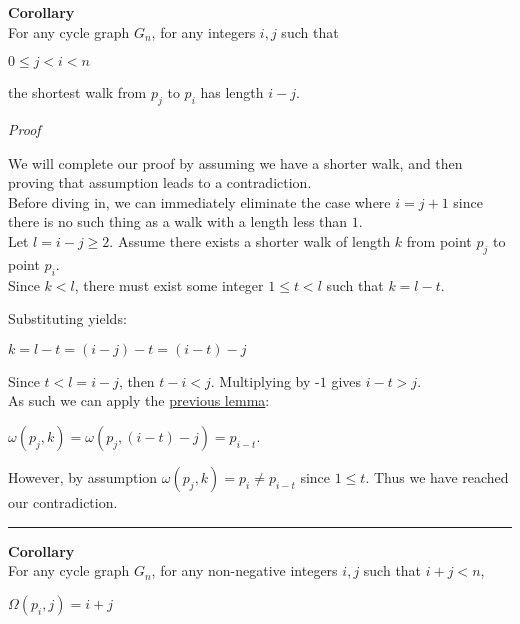 \documentclass[a4paper,12pt]{article}
\begin{document}
\label{corollary:shortest_walk_1}
\begin{tcolorbox}
\textbf{Corollary}\\
For any cycle graph $G_n$, for any integers $i, j$ such that

\begin{center}
$0 \leq j < i < n$
\end{center}

\noindent the shortest walk from $p_j$ to $p_i$ has length $i - j$.
\end{tcolorbox}

\noindent
\textit{Proof}

\noindent We will complete our proof by assuming we have a shorter walk, and then proving that assumption leads to a contradiction.\\

\noindent Before diving in, we can immediately eliminate the case where $i = j + 1$ since there is no such thing as a walk with a length less than $1$.\\

\noindent Let $l = i - j \geq 2$. Assume there exists a shorter walk of length $k$ from point $p_j$ to point $p_i$.\\

\noindent Since $k < l$, there must exist some integer $1 \leq t < l$ such that $k = l - t$.

\noindent Substituting yields:
\begin{center}
$k = l - t = (i - j) - t = (i - t) - j$
\end{center}

\noindent Since $t < l = i - j$, then $t - i < j$. Multiplying by -$1$ gives $i - t > j$.\\

\noindent As such we can apply the \hyperref[lemma:existence_of_walk_1]{previous lemma}:
\begin{center}
$\omega(p_j, k) = \omega(p_j, (i - t) - j) = p_{i - t}$.
\end{center}

\noindent However, by assumption $\omega(p_j, k) = p_i \neq p_{i - t}$ since $1 \leq t$. Thus we have reached our contradiction.

\begin{center}
\noindent\rule{8cm}{0.4pt}
\end{center}


\label{corollary:Omega_result_1}
\begin{tcolorbox}
\textbf{Corollary}\\
For any cycle graph $G_n$, for any non-negative integers $i, j$ such that $i + j < n$,
\begin{center}
$\Omega(p_i, j) = i + j$
\end{center}
\end{tcolorbox}
\end{document}
